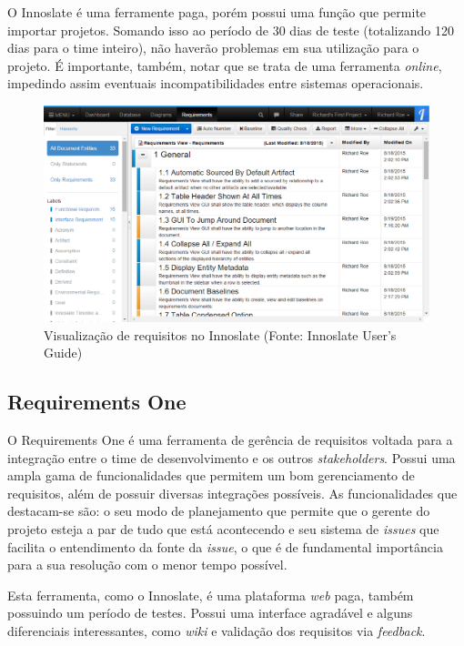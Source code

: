 O Innoslate é uma ferramente paga, porém possui uma função que permite importar projetos. Somando isso ao período de 30 dias de teste (totalizando 120 dias para o time inteiro), não haverão problemas em sua utilização para o projeto. É importante, também, notar que se trata de uma ferramenta \textit{online}, impedindo assim eventuais incompatibilidades entre sistemas operacionais.

\begin{figure}[htb]
\centering
  \includegraphics[keepaspectratio=true,scale=0.4]
  {figuras/innoslate.eps}
  \caption{Visualização de requisitos no Innoslate (Fonte: Innoslate User’s Guide)}
  \label{innoslate-pic}
\end{figure}

\clearpage{}

\subsection{Requirements One}

O Requirements One é uma ferramenta de gerência de requisitos voltada para a integração entre o time de desenvolvimento e os outros \textit{stakeholders}. Possui uma ampla gama de funcionalidades que permitem um bom gerenciamento de requisitos, além de possuir diversas integrações possíveis. As funcionalidades que destacam-se são: o seu modo de planejamento que permite que o gerente do projeto esteja a par de tudo que está acontecendo e seu sistema de \textit{issues} que facilita o entendimento da fonte da \textit{issue}, o que é de fundamental importância para a sua resolução com o menor tempo possível.

Esta ferramenta, como o Innoslate, é uma plataforma \textit{web} paga, também possuindo um período de testes. Possui uma interface agradável e alguns diferenciais interessantes, como \textit{wiki} e validação dos requisitos via \textit{feedback}.

